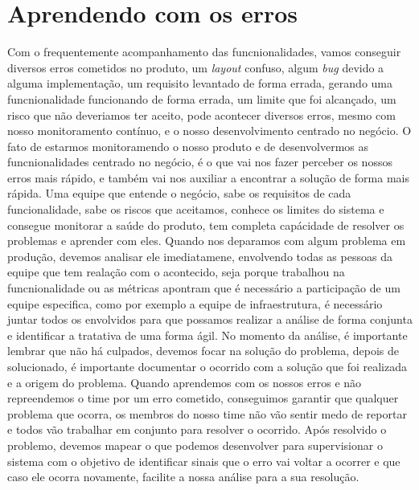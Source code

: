     \section{Aprendendo com os erros}
      Com o frequentemente acompanhamento das funcnionalidades, vamos conseguir
      diversos erros cometidos no produto, um \textit{layout} confuso, algum
      \textit{bug} devido a alguma implementação, um requisito levantado de
      forma errada, gerando uma funcnionalidade funcionando de forma errada, um
      limite que foi alcançado, um risco que não deveriamos ter aceito, pode
      acontecer diversos erros, mesmo com nosso monitoramento contínuo, e o nosso
      desenvolvimento centrado no negócio. O fato de estarmos monitoramendo o nosso
      produto e de desenvolvermos as funcnionalidades centrado no negócio, é o que
      vai nos fazer perceber os nossos erros mais rápido, e também vai nos auxiliar
      a encontrar a solução de forma mais rápida. Uma equipe que entende o negócio,
      sabe os requisitos de cada funcionalidade, sabe os riscos que aceitamos,
      conhece os limites do sistema e consegue monitorar a saúde do produto, tem
      completa capácidade de resolver os problemas e aprender com eles. \newline
      Quando nos deparamos com algum problema em produção, devemos analisar ele
      imediatamene, envolvendo todas as pessoas da equipe que tem realação com o
      acontecido, seja porque trabalhou na funcnionalidade ou as métricas apontram
      que é necessário a participação de um equipe especifica, como por exemplo a
      equipe de infraestrutura, é necessário juntar todos os envolvidos para que
      possamos realizar a análise de forma conjunta e identificar a tratativa de
      uma forma ágil. No momento da análise, é importante lembrar que não há
      culpados, devemos focar na solução do problema, depois de solucionado, é
      importante documentar o ocorrido com a solução que foi realizada e a origem
      do problema. Quando aprendemos com os nossos erros e não repreendemos o
      time por um erro cometido, conseguimos garantir que qualquer problema que
      ocorra, os membros do nosso time não vão sentir medo de reportar e todos vão
      trabalhar em conjunto para resolver o ocorrido. Após resolvido o problemo,
      devemos mapear o que podemos desenvolver para supervisionar o sistema com o
      objetivo de identificar sinais que o erro vai voltar a ocorrer e que caso
      ele ocorra novamente, facilite a nossa análise para a sua resolução. \newline

